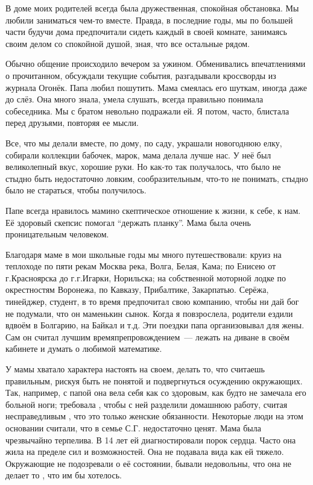 В доме моих родителей всегда была дружественная, спокойная обстановка. Мы любили заниматься чем-то вместе. Правда, в последние годы, мы по большей части будучи дома предпочитали сидеть каждый в своей комнате, занимаясь своим делом со спокойной душой, зная, что все остальные рядом.

Обычно общение происходило вечером за ужином. Обменивались впечатлениями о прочитанном, обсуждали текущие события, разгадывали кроссворды из журнала Огонёк. Папа любил пошутить. Мама  смеялась его шуткам,  иногда даже до слёз. Она много знала, умела слушать, всегда правильно понимала собеседника. Мы с братом невольно подражали ей. Я потом, часто, блистала перед друзьями, повторяя ее мысли.

Все, что мы делали вместе, по дому, по саду, украшали новогоднюю елку, собирали коллекции бабочек, марок, мама делала лучше нас. У неё был великолепный вкус, хорошие руки. Но как-то так получалось, что было не стыдно быть недостаточно ловким, сообразительным, что-то не понимать, стыдно было не стараться, чтобы получилось.

Папе всегда нравилось мамино скептическое отношение к жизни, к себе, к нам. Её здоровый скепсис помогал “держать планку”. Мама была очень проницательным человеком.

Благодаря маме в мои школьные годы мы много путешествовали:
круиз на теплоходе по пяти рекам Москва река, Волга, Белая, Кама;
по Енисею от г.Красноярска до г.г.Игарки, Норильска;
на собственной моторной лодке по окрестностям Воронежа, по Кавказу, Прибалтике, Закарпатью.
Серёжа, тинейджер, студент, в то время предпочитал свою компанию, чтобы ни дай бог не подумали, что он маменькин сынок.
Когда я повзрослела, родители ездили вдвоём в Болгарию, на Байкал и т.д.
Эти поездки папа организовывал для жены.
Сам он считал лучшим вре\-мя\-пре\-п\-ро\-во\-ж\-де\-ни\-ем~--- лежать на диване в своём кабинете и думать о любимой математике.

У мамы хватало характера настоять на своем, делать то, что считаешь правильным, рискуя быть не понятой и подвергнуться осуждению окружающих. Так, например, с папой она вела себя как со здоровым, как будто не замечала его больной ноги; требовала , чтобы с ней разделили домашнюю работу, считая несправедливым , что это только женские обязанности. Некоторые люди на этом основании считали, что в семье С.Г. недостаточно ценят.
Мама была чрезвычайно терпелива. В 14 лет ей диагностировали порок сердца. Часто она жила на пределе сил и возможностей. Она не подавала вида как ей тяжело. Окружающие не подозревали о её состоянии, бывали недовольны, что она не делает то , что им бы хотелось.

